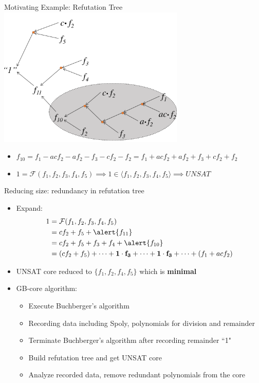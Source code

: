 \documentclass[xcolor=dvipsnames]{beamer}
\newcommand{\bi}{\begin{itemize}}
\newcommand{\ei}{\end{itemize}}
\newcommand{\Func}{{\mathcal{F}}}
\begin{document}
\begin{frame}{\large{Motivating Example: Refutation Tree}}
\vspace{-0.1in}
\includegraphics[width=3.5in]{./refutation_1.pdf}
\pause
\bi
\item $f_{10}=f_1-acf_2-af_2-f_3-cf_2-f_2 = f_1+acf_2+af_2+f_3+cf_2+f_2$
\item $1 = \Func(f_1,f_2,f_3,f_4,f_5)\implies 1 \in \langle f_1,f_2,f_3,f_4,f_5\rangle \implies UNSAT$
\ei
\end{frame}
\begin{frame}{\large{Reducing size: redundancy in refutation tree}}
\bi
\item Expand: \begin{align*}
		1 &= \Func(f_1,f_2,f_3,f_4,f_5)\\
		&= cf_2+f_5+\alert{f_{11}}\\
		&=cf_2+f_5+f_3+f_4+\alert{f_{10}}\\
		&=(cf_2 + f_5) + \dots + \mathbf{1\cdot f_3} + \dots + \mathbf{1\cdot
  f_3}+ \dots + (f_1 + acf_2)
		\end{align*}
\item UNSAT core reduced to $\{f_1,f_2,f_4,f_5\}$ which is {\bf minimal}
\item \alert{GB-core algorithm}:
	\bi
	\item Execute Buchberger's algorithm
	\item Recording data including Spoly, polynomials for division and remainder
	\item Terminate Buchberger's algorithm after recording remainder ``1"
	\item Build refutation tree and get UNSAT core
	\item Analyze recorded data, remove redundant polynomials from the core
	\ei
\ei
\end{frame}
\end{document}
